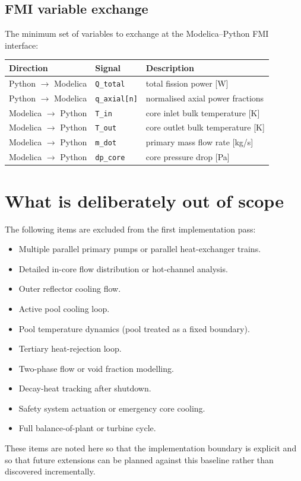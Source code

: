 \documentclass[11pt]{article}
\begin{document}
\subsection{FMI variable exchange}

The minimum set of variables to exchange at the Modelica--Python FMI
interface:

\begin{center}
\begin{tabular}{lll}
\hline
Direction & Signal & Description \\
\hline
Python $\to$ Modelica & \texttt{Q\_total} & total fission power [W] \\
Python $\to$ Modelica & \texttt{q\_axial[n]} & normalised axial power fractions \\
Modelica $\to$ Python & \texttt{T\_in} & core inlet bulk temperature [K] \\
Modelica $\to$ Python & \texttt{T\_out} & core outlet bulk temperature [K] \\
Modelica $\to$ Python & \texttt{m\_dot} & primary mass flow rate [kg/s] \\
Modelica $\to$ Python & \texttt{dp\_core} & core pressure drop [Pa] \\
\hline
\end{tabular}
\end{center}

\section{What is deliberately out of scope}

The following items are excluded from the first implementation pass:

\begin{itemize}
  \item Multiple parallel primary pumps or parallel heat-exchanger trains.
  \item Detailed in-core flow distribution or hot-channel analysis.
  \item Outer reflector cooling flow.
  \item Active pool cooling loop.
  \item Pool temperature dynamics (pool treated as a fixed boundary).
  \item Tertiary heat-rejection loop.
  \item Two-phase flow or void fraction modelling.
  \item Decay-heat tracking after shutdown.
  \item Safety system actuation or emergency core cooling.
  \item Full balance-of-plant or turbine cycle.
\end{itemize}

These items are noted here so that the implementation boundary is
explicit and so that future extensions can be planned against this
baseline rather than discovered incrementally.
\end{document}
